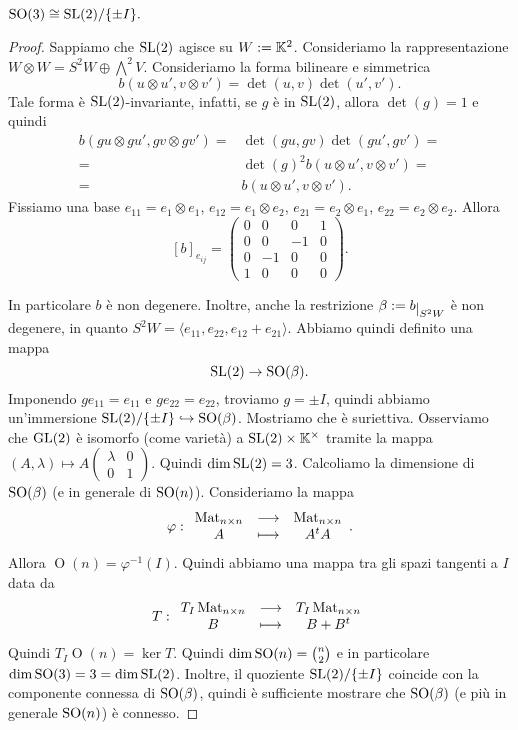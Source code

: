 \begin{proposition}
$\operatorname{SO}(3)\cong \mathrm{SL}(2)/\{\pm I\}.$
\end{proposition}
\begin{proof}
Sappiamo che $\mathrm{SL}(2)$ agisce su $W:= \mathbb{K}^2$. Consideriamo la rappresentazione $W\otimes W=S^2 W \oplus \bigwedge^2 V$. 
Consideriamo la forma bilineare e simmetrica 
\[b(u\otimes u', v \otimes v')=\det(u,v)\det(u',v').\] 
Tale forma è $\mathrm{SL}(2)$-invariante, infatti, se $g$ è in $\mathrm{SL}(2)$, allora $\det(g)=1$ e quindi
\begin{align*}
	b(gu\otimes gu', gv \otimes gv')=&\det(gu,gv)\det(gu',gv')=\\
	=&\det(g)^2b(u\otimes u', v \otimes v')=\\
	=&b(u\otimes u', v \otimes v').
\end{align*}
Fissiamo una base $e_{11}=e_1\otimes e_1$, $e_{12}=e_1\otimes e_2$, $e_{21}=e_2\otimes e_1$, $e_{22}=e_2\otimes e_2$. Allora \[[b]_{e_{ij}}=\begin{pmatrix}
    0 & 0 & 0 & 1 \\
    0 &0 & -1 & 0 \\
    0 & -1 & 0&0 \\
    1 &0&0&0
\end{pmatrix}.\]

In particolare $b$ è non degenere. Inoltre, anche la restrizione $\beta \coloneqq b\res{S^2W}$ è non degenere, in quanto $S^2W=\langle e_{11},e_{22},e_{12}+e_{21}\rangle$. Abbiamo quindi definito una mappa 
\[\mathrm{SL}(2)\to \operatorname{SO}(\beta).\] 
Imponendo $g e_{11}=e_{11}$ e $g e_{22}=e_{22}$, troviamo $g=\pm I$, quindi abbiamo un'immersione $\mathrm{SL}(2)/\{\pm I\}\hookrightarrow \operatorname{SO}(\beta)$. Mostriamo che è suriettiva. Osserviamo che $\mathrm{GL}(2)$ è isomorfo (come varietà) a $\mathrm{SL}(2)\times \mathbb{K}^\times$ tramite la mappa $(A,\lambda)\mapsto A \begin{pmatrix}
    \lambda & 0 \\ 0 & 1
\end{pmatrix}$. Quindi $\dim\mathrm{SL}(2)=3$. Calcoliamo la dimensione di $\operatorname{SO}(\beta)$ (e in generale di $\operatorname{SO}(n)$). Consideriamo la mappa 
\[\varphi:\begin{array}{ccc} {\operatorname{Mat}_{n\times n}} & \longrightarrow & {\operatorname{Mat}_{n\times n}}\\ {A} & \longmapsto & {A^t A} \end{array}.\] 
Allora $\operatorname{O}(n)=\varphi^{-1}(I)$. Quindi abbiamo una mappa tra gli spazi tangenti a $I$ data da 
\[T:\begin{array}{ccc} {T_I\operatorname{Mat}_{n\times n}} & \longrightarrow & {T_I\operatorname{Mat}_{n\times n}}\\ {B} & \longmapsto & {B+B^t} \end{array}\]
Quindi $T_I\operatorname{O}(n)=\ker T$. Quindi $\dim\operatorname{SO}(n)=\binom{n}{2}$ e in particolare $\dim\operatorname{SO}(3)=3=\dim\mathrm{SL}(2)$.  Inoltre, il quoziente $\mathrm{SL}(2)/\{\pm I\}$ coincide con la componente connessa di $\operatorname{SO}(\beta)$, quindi è sufficiente mostrare che $\operatorname{SO}(\beta)$ (e più in generale $\operatorname{SO}(n)$) è connesso. 


\end{proof}
